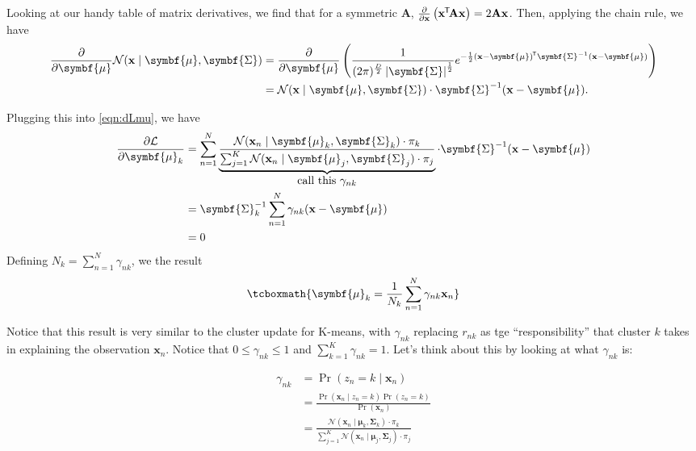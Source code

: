 \documentclass[11pt]{article}
\newcommand{\xb}{\mathbf{x}}
\newcommand{\ub}{\symbf{\mu}}
\newcommand{\Sb}{\symbf{\Sigma}}
\newcommand*{\tran}{^{\mkern-1.5mu\mathsf{T}}}
\begin{document}
Looking at our handy table of matrix derivatives, we find that for a symmetric
$\mathbf{A}$, $\frac{\partial}{\partial \mathbf{x}} \left(\xb\tran\!
\mathbf{A} \xb \right) = 2 \mathbf{A}\xb$. Then, applying the chain rule, we
have
\begin{align*}
  \frac{\partial}{\partial \ub} \mathcal{N}(\xb \mid \ub, \Sb) &=
    \frac{\partial}{\partial \ub}
    \left( \frac{1}{(2 \pi)^\frac{D}{2}\left|\Sb\right|^\frac{1}{2}}
              e^{-\frac{1}{2} (\xb - \ub)\tran \Sb^{-1} (\xb-\ub)}\right) \\
  &= \mathcal{N}(\xb \mid \ub, \Sb) \cdot \Sb^{-1} (\xb - \ub).
\end{align*}

Plugging this into \eqref{eqn:dLmu}, we have
\begin{align*}
  \frac{\partial\mathcal{L}}{\partial\ub_k} &= \sum_{n=1}^N
    \underbrace{\frac{\mathcal{N}(\xb_n \mid \ub_k, \Sb_k) \cdot \pi_k}
    {\sum_{j=1}^K \mathcal{N}(\xb_n \mid \ub_j, \Sb_j) \cdot \pi_j}}_{
      \mathclap{\text{\normalsize call this $\gamma_{nk}$} } }
    \cdot \Sb^{-1} (\xb - \ub) \\
  &= \Sb_k^{-1} \sum_{n=1}^{N} \gamma_{nk} (\xb - \ub) \\
  &= 0
\end{align*}
Defining $N_k = \sum_{n=1}^N \gamma_{nk}$, we   the result
\begin{equation}
  \tcboxmath{\ub_k = \frac{1}{N_k} \sum_{n=1}^N \gamma_{nk} \xb_n}
  \label{eqn:mu}
\end{equation}

Notice that this result is very similar to the cluster update for K-means, with
$\gamma_{nk}$ replacing $r_{nk}$ as tge ``responsibility'' that cluster $k$
takes in explaining the observation $\xb_n$. Notice that
$0 \leq \gamma_{nk} \leq 1$ and $\sum_{k=1}^K \gamma_{nk} = 1$. Let's think
about this by looking at what $\gamma_{nk}$ is:

\begin{align*}
  \gamma_{nk} &= \Pr (z_n = k \mid \xb_n) \\
    &= \frac{\Pr(\xb_n \mid z_n = k) \Pr(z_n = k)}{\Pr(\xb_n)} \\
    &= \frac{\mathcal{N}(\xb_n \mid \ub_k, \Sb_k) \cdot \pi_k}
    {\sum_{j=1}^K \mathcal{N}(\xb_n \mid \ub_j, \Sb_j) \cdot \pi_j}
\end{align*}
\begin{center}
\end{center}
\end{document}
